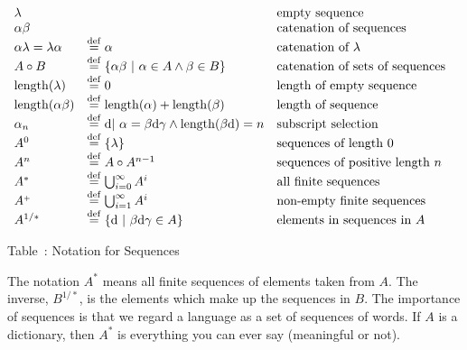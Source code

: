 $
\begin{array}{lll}

\lambda	                        && \mbox{empty sequence}                \\
\alpha\beta                     && \mbox{catenation of sequences}       \\
\alpha\lambda = \lambda\alpha & \eqldef \alpha 
                              & \mbox{catenation of $\lambda$}          \\
A\circ B &\eqldef \{\alpha\beta\ |\ \alpha\in A \wedge \beta\in B\}		
                                & \mbox{catenation of sets of sequences} \\

{\rm length}(\lambda) & \eqldef 0 & \mbox{length of empty sequence}     \\
{\rm length}(\alpha\beta) &\eqldef {\rm length}(\alpha)
                                      +  {\rm length}(\beta)
                        & \mbox{length of sequence }                    \\
\alpha_n
&\eqldef {\rm d} |\ \alpha=\beta{\rm d}\gamma\wedge
{\rm length}(\beta{\rm d})=n &\mbox{subscript selection}  \\

A^0 &\eqldef \{\lambda\}        & \mbox{sequences of length 0}          \\
A^n &\eqldef A\circ A^{n-1}		
                                & \mbox{sequences of positive length $n$} \\
A^* &\eqldef \bigcup_{i=0}^{\infty} A^i & \mbox{all finite sequences}   \\
A^{\scriptscriptstyle +} &\eqldef \bigcup_{i=1}^{\infty} A^i
                                & \mbox{non-empty finite sequences}     \\
A^{1/*} &\eqldef \{{\rm d}\ |\ \beta{\rm d}\gamma\in A\}
                                & \mbox{elements in sequences in $A$}
\end{array}$

\begin{center}
Table~\thetable: Notation for Sequences
\end{center}

\noindent
The notation $A^*$ means all finite sequences of elements taken from $A$.
The inverse, $B^{1/*}$, is the elements which make up the sequences in $B$.  
The importance of sequences is that we regard a language as a set of 
sequences of words.  
If $A$ is a dictionary, then $A^*$ is everything you can ever say 
(meaningful or not).

